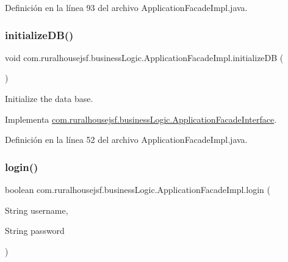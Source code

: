 Definición en la línea 93 del archivo Application\+Facade\+Impl.\+java.

\mbox{\label{classcom_1_1ruralhousejsf_1_1business_logic_1_1_application_facade_impl_a1e6cbb70c9568899c86135b3264b431d}} 
\subsubsection{\texorpdfstring{initializeDB()}{initializeDB()}}
{\footnotesize\ttfamily void com.\+ruralhousejsf.\+business\+Logic.\+Application\+Facade\+Impl.\+initialize\+DB (\begin{DoxyParamCaption}{ }\end{DoxyParamCaption})}



Initialize the data base. 



Implementa \mbox{\hyperlink{interfacecom_1_1ruralhousejsf_1_1business_logic_1_1_application_facade_interface_a4670319006cee17060e0c84695d7195f}{com.\+ruralhousejsf.\+business\+Logic.\+Application\+Facade\+Interface}}.



Definición en la línea 52 del archivo Application\+Facade\+Impl.\+java.

\mbox{\label{classcom_1_1ruralhousejsf_1_1business_logic_1_1_application_facade_impl_a7af883dece6a0de1e1be2b83e3d4a23f}} 
\subsubsection{\texorpdfstring{login()}{login()}}
{\footnotesize\ttfamily boolean com.\+ruralhousejsf.\+business\+Logic.\+Application\+Facade\+Impl.\+login (\begin{DoxyParamCaption}\item[{String}]{username,  }\item[{String}]{password }\end{DoxyParamCaption})}



